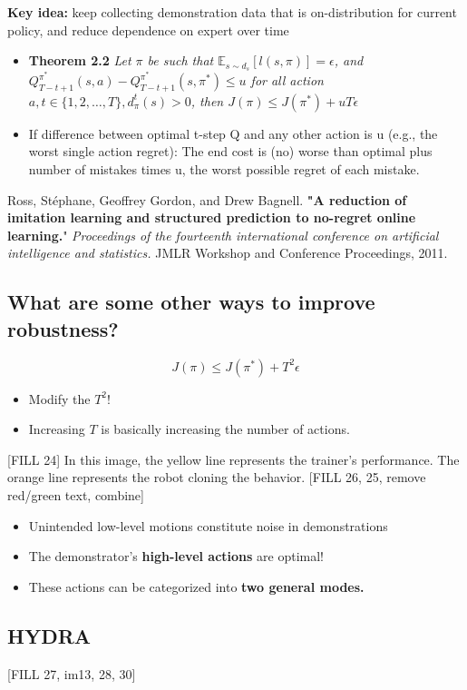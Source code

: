 \documentclass[10pt]{article}
\begin{document}
\textbf{Key idea:} keep collecting demonstration data that is on-distribution for current policy, and reduce dependence on expert over time
\begin{itemize}
	\item \textbf{Theorem 2.2} \textit{Let $\pi$ be such that $\mathbb{E}_{s \sim d_s} [l(s, \pi)] = \epsilon$, and $Q_{T - t + 1}^{\pi^*} (s, a) - Q_{T - t + 1}^{\pi^*}(s, \pi^*) \leq u$ for all action $a, t \in \{1, 2, \dots, T\}, d_\pi^t (s) > 0$, then $J(\pi) \leq J(\pi^*) + uT\epsilon$}
	\item If difference between optimal t-step Q and any other action is u (e.g., the worst single action regret): The end cost is (no) worse than optimal plus number of mistakes times u, the worst possible regret of each mistake.
\end{itemize}
Ross, Stéphane, Geoffrey Gordon, and Drew Bagnell. \textbf{"A reduction of imitation learning and structured prediction to no-regret online learning.}" \textit{Proceedings of the fourteenth international conference on artificial intelligence and statistics.} JMLR Workshop and Conference Proceedings, 2011.

\subsection*{What are some other ways to improve robustness?}
\[J(\pi) \leq J(\pi^*) + T^2 \epsilon\]
\begin{itemize}
	\item Modify the $T^2$!
	\item Increasing $T$ is basically increasing the number of actions.
\end{itemize}

[FILL 24]
In this image, the yellow line represents the trainer's performance.  The orange line represents the robot cloning the behavior.
[FILL 26, 25, remove red/green text, combine]
\begin{itemize}
	\item Unintended low-level motions constitute noise in demonstrations
	\item The demonstrator's \textbf{high-level actions} are optimal!
	\item These actions can be categorized into \textbf{two general modes.}
\end{itemize}

\subsection*{HYDRA}
[FILL 27, im13, 28, 30]
\end{document}
